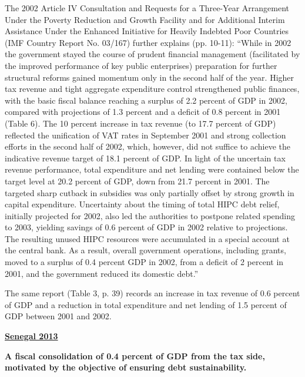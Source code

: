 The 2002 Article IV Consultation and Requests for a Three-Year Arrangement Under the Poverty Reduction and Growth Facility and for Additional Interim Assistance Under the Enhanced Initiative for Heavily Indebted Poor Countries (IMF Country Report No. 03/167) further explains (pp. 10-11): “While in 2002 the government stayed the course of prudent financial management (facilitated by the improved performance of key public enterprises) preparation for further structural reforms gained momentum only in the second half of the year. Higher tax revenue and tight aggregate expenditure control strengthened public finances, with the basic fiscal balance reaching a surplus of 2.2 percent of GDP in 2002, compared with projections of 1.3 percent and a deficit of 0.8 percent in 2001 (Table 6). The 10 percent increase in tax revenue (to 17.7 percent of GDP) reflected the unification of VAT rates in September 2001 and strong collection efforts in the second half of 2002, which, however, did not suffice to achieve the indicative revenue target of 18.1 percent of GDP. In light of the uncertain tax revenue performance, total expenditure and net lending were contained below the target level at 20.2 percent of GDP, down from 21.7 percent in 2001. The targeted sharp cutback in subsidies was only partially offset by strong growth in capital expenditure. Uncertainty about the timing of total HIPC debt relief, initially projected for 2002, also led the authorities to postpone related spending to 2003, yielding savings of 0.6 percent of GDP in 2002 relative to projections. The resulting unused HIPC resources were accumulated in a special account at the central bank. As a result, overall government operations, including grants, moved to a surplus of 0.4 percent GDP in 2002, from a deficit of 2 percent in 2001, and the government reduced its domestic debt.”

The same report (Table 3, p. 39) records an increase in tax revenue of 0.6 percent of GDP and a reduction in total expenditure and net lending of 1.5 percent of GDP between 2001 and 2002.

\textbf{\underline{Senegal 2013}}

\textbf{A fiscal consolidation of 0.4 percent of GDP from the tax side, motivated by the objective of ensuring debt sustainability.}

